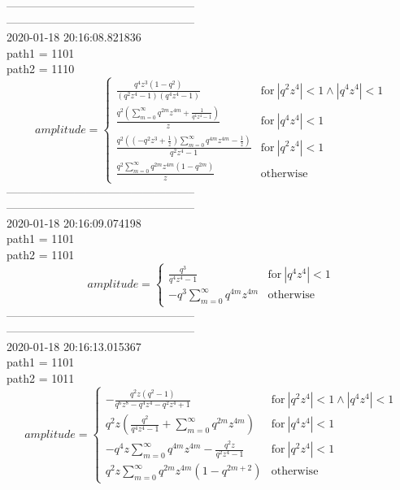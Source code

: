 \documentclass{jsreport}
\begin{document}
--------------------------------------------------\\
--------------------------------------------------\\
2020-01-18 20:16:08.821836\\
path1 = 1101\\
path2 = 1110\\
$$amplitude = \begin{cases} \frac{q^{4} z^{3} \left(1 - q^{2}\right)}{\left(q^{2} z^{4} - 1\right) \left(q^{4} z^{4} - 1\right)} & \text{for}\: \left|{q^{2} z^{4}}\right| < 1 \wedge \left|{q^{4} z^{4}}\right| < 1 \\\frac{q^{2} \left(\sum_{m=0}^{\infty} q^{2 m} z^{4 m} + \frac{1}{q^{4} z^{4} - 1}\right)}{z} & \text{for}\: \left|{q^{4} z^{4}}\right| < 1 \\\frac{q^{2} \left(\left(- q^{2} z^{3} + \frac{1}{z}\right) \sum_{m=0}^{\infty} q^{4 m} z^{4 m} - \frac{1}{z}\right)}{q^{2} z^{4} - 1} & \text{for}\: \left|{q^{2} z^{4}}\right| < 1 \\\frac{q^{2} \sum_{m=0}^{\infty} q^{2 m} z^{4 m} \left(1 - q^{2 m}\right)}{z} & \text{otherwise} \end{cases}$$
--------------------------------------------------\\
--------------------------------------------------\\
2020-01-18 20:16:09.074198\\
path1 = 1101\\
path2 = 1101\\
$$amplitude = \begin{cases} \frac{q^{3}}{q^{4} z^{4} - 1} & \text{for}\: \left|{q^{4} z^{4}}\right| < 1 \\- q^{3} \sum_{m=0}^{\infty} q^{4 m} z^{4 m} & \text{otherwise} \end{cases}$$
--------------------------------------------------\\
--------------------------------------------------\\
2020-01-18 20:16:13.015367\\
path1 = 1101\\
path2 = 1011\\
$$amplitude = \begin{cases} - \frac{q^{2} z \left(q^{2} - 1\right)}{q^{6} z^{8} - q^{4} z^{4} - q^{2} z^{4} + 1} & \text{for}\: \left|{q^{2} z^{4}}\right| < 1 \wedge \left|{q^{4} z^{4}}\right| < 1 \\q^{2} z \left(\frac{q^{2}}{q^{4} z^{4} - 1} + \sum_{m=0}^{\infty} q^{2 m} z^{4 m}\right) & \text{for}\: \left|{q^{4} z^{4}}\right| < 1 \\- q^{4} z \sum_{m=0}^{\infty} q^{4 m} z^{4 m} - \frac{q^{2} z}{q^{2} z^{4} - 1} & \text{for}\: \left|{q^{2} z^{4}}\right| < 1 \\q^{2} z \sum_{m=0}^{\infty} q^{2 m} z^{4 m} \left(1 - q^{2 m + 2}\right) & \text{otherwise} \end{cases}$$
\end{document}

